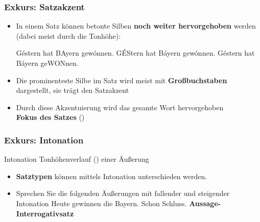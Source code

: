 \begin{frame}
\frametitle{Exkurs: Satzakzent}

\begin{itemize}
	\item In einem Satz können betonte Silben \textbf{noch weiter hervorgehoben} werden (dabei meist durch die Tonhöhe):
	
	\eal 
	\ex Géstern hat BAyern gewónnen.
	\ex GÉStern hat Báyern gewónnen.
	\ex Géstern hat Báyern geWONnen.
	\zl
	\item Die prominenteste Silbe im Satz wird meist mit \textbf{Großbuchstaben} dargestellt, sie trägt den Satzakzent

	\item Durch diese Akzentuierung wird das gesamte Wort
hervorgehoben \ras\\ \textbf{Fokus des Satzes} ()
	
\end{itemize}

\end{frame}




\begin{frame}
\frametitle{Exkurs: Intonation}

\begin{block}{Intonation}
Tonhöhenverlauf () einer Äußerung
\end{block}

\begin{itemize}
	\item \textbf{Satztypen} können mittels Intonation unterschieden werden.
	
	\item Sprechen Sie die folgenden Äußerungen mit fallender und steigender Intonation
	\eal 
	\ex Heute gewinnen die Bayern.
	\ex Schon Schluss.
        \zl
\pause
	\textbf{Aussage-} \vs \textbf{Interrogativsatz}	
	
\end{itemize}

\end{frame}



